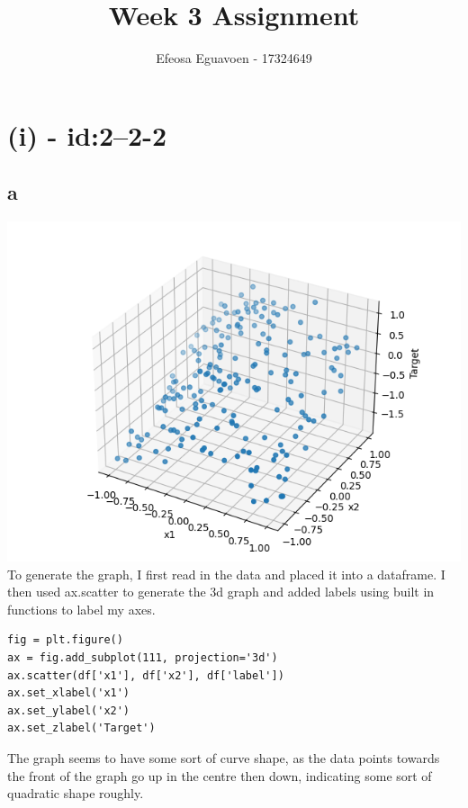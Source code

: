 \documentclass[11pt]{article} %
\title{Week 3 Assignment}
\author{Efeosa Eguavoen - 17324649}
\begin{document}
\maketitle

\section{(i) - id:2--2-2}
\subsection{a}
\includegraphics[scale=0.5]{3Ddata.jpg}
\\
To generate the graph, I first read in the data and placed it into a dataframe. I then used ax.scatter to generate the 3d graph and added labels using built in functions to label my axes. 
\begin{verbatim}
fig = plt.figure()
ax = fig.add_subplot(111, projection='3d')
ax.scatter(df['x1'], df['x2'], df['label'])
ax.set_xlabel('x1')
ax.set_ylabel('x2')
ax.set_zlabel('Target')
\end{verbatim}
The graph seems to have some sort of curve shape, as the data points towards the front of the graph go up in the centre then down, indicating some sort of quadratic shape roughly. 
\end{document}
